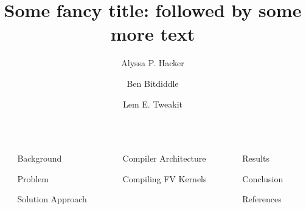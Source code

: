 \documentclass[final]{beamer}
\title{Some fancy title: followed by some more text}
\author{Alyssa P. Hacker \inst{1} \and Ben Bitdiddle \inst{2} \and Lem E. Tweakit \inst{2}}
\institute[shortinst]{\inst{1} Some Institute \samelineand \inst{2} Another Institute}
\newlength{\sepwidth}
\newlength{\colwidth}
\newcommand{\separatorcolumn}{\begin{column}{\sepwidth}\end{column}}
\begin{document}
\begin{frame}[t]
\begin{columns}[t]
\separatorcolumn

\begin{column}{\colwidth}

  \begin{block}{Background}

     

  \end{block}

  \begin{block}{Problem}

    

  \end{block}
  
  \begin{block}{Solution Approach}

    

  \end{block}

\end{column}

\separatorcolumn

\begin{column}{\colwidth}

  \begin{block}{Compiler Architecture}

    

  \end{block}
  \begin{block}{Compiling FV Kernels}

   

  \end{block}

\end{column}

\separatorcolumn

\begin{column}{\colwidth}

  \begin{block}{Results}

   

  \end{block}

  \begin{block}{Conclusion}

    

  \end{block}

  \begin{block}{References}

    \nocite{*}
    \footnotesize{}

  \end{block}

\end{column}

\separatorcolumn
\end{columns}
\end{frame}
\end{document}
